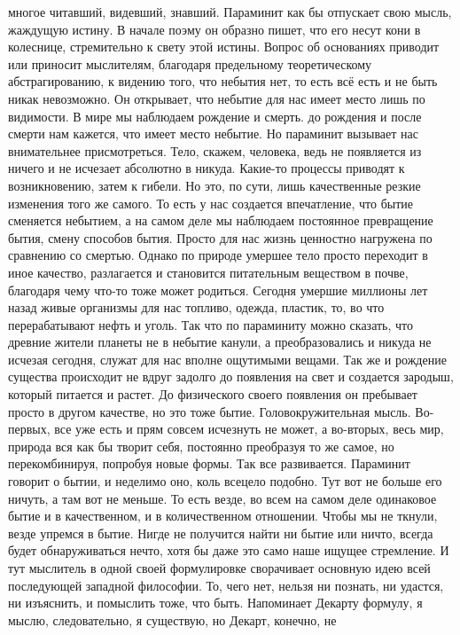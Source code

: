 многое читавший, видевший, знавший. Параминит как бы отпускает свою мысль,
жаждущую истину. В начале поэму он образно пишет, что его несут кони в
колеснице, стремительно к свету этой истины. Вопрос об основаниях приводит или
приносит мыслителям, благодаря предельному теоретическому абстрагированию, к
видению того, что небытия нет, то есть всё есть и не быть никак невозможно. Он
открывает, что небытие для нас имеет место лишь по видимости. В мире мы
наблюдаем рождение и смерть. до рождения и после смерти нам кажется, что имеет
место небытие. Но параминит вызывает нас внимательнее присмотреться. Тело,
скажем, человека, ведь не появляется из ничего и не исчезает абсолютно в никуда.
Какие-то процессы приводят к возникновению, затем к гибели. Но это, по сути,
лишь качественные резкие изменения того же самого. То есть у нас создается
впечатление, что бытие сменяется небытием, а на самом деле мы наблюдаем
постоянное превращение бытия, смену способов бытия. Просто для нас жизнь
ценностно нагружена по сравнению со смертью. Однако по природе умершее тело
просто переходит в иное качество, разлагается и становится питательным веществом
в почве, благодаря чему что-то тоже может родиться. Сегодня умершие миллионы лет
назад живые организмы для нас топливо, одежда, пластик, то, во что
перерабатывают нефть и уголь. Так что по параминиту можно сказать, что древние
жители планеты не в небытие канули, а преобразовались и никуда не исчезая
сегодня, служат для нас вполне ощутимыми вещами. Так же и рождение существа
происходит не вдруг задолго до появления на свет и создается зародыш, который
питается и растет. До физического своего появления он пребывает просто в другом
качестве, но это тоже бытие. Головокружительная мысль. Во-первых, все уже есть и
прям совсем исчезнуть не может, а во-вторых, весь мир, природа вся как бы творит
себя, постоянно преобразуя то же самое, но перекомбинируя, попробуя новые формы.
Так все развивается. Параминит говорит о бытии, и неделимо оно, коль всецело
подобно. Тут вот не больше его ничуть, а там вот не меньше. То есть везде, во
всем на самом деле одинаковое бытие и в качественном, и в количественном
отношении. Чтобы мы не ткнули, везде упремся в бытие. Нигде не получится найти
ни бытие или ничто, всегда будет обнаруживаться нечто, хотя бы даже это само
наше ищущее стремление. И тут мыслитель в одной своей формулировке сворачивает
основную идею всей последующей западной философии. То, чего нет, нельзя ни
познать, ни удастся, ни изъяснить, и помыслить тоже, что быть. Напоминает
Декарту формулу, я мыслю, следовательно, я существую, но Декарт, конечно, не

